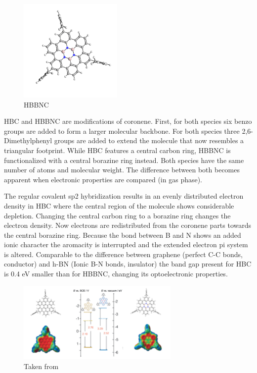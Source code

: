 \label{section_HBBNC}

\begin{figure}\centering
	\includegraphics[angle=90,width=5cm]{./images/molecules/max-zoom/HBBNC-600}
	\caption{HBBNC}
	\label{fig:HBBNC-molecule}
\end{figure}

HBC and HBBNC are modifications of coronene. First, for both species six benzo groups are added to form a larger molecular backbone. For both species three 2,6-Dimethylphenyl groups are added to extend the molecule that now resembles a triangular footprint. While HBC features a central carbon ring, HBBNC is functionalized with a central borazine ring instead.
Both species have the same number of atoms and molecular weight. The difference between both becomes apparent when electronic properties are compared (in gas phase).


The regular covalent sp2 hybridization results in an evenly distributed electron density in HBC where the central region of the molecule shows considerable depletion. Changing the central carbon ring to a borazine ring changes the electron density. Now electrons are redistributed from the coronene parts towards the central borazine ring. Because the bond between B and N shows an added ionic character the aromacity is interrupted and the extended electron pi system is altered. Comparable to the difference between graphene (perfect C-C bonds, conductor) and h-BN (Ionic B-N bonds, insulator) the band gap present for HBC is 0.4 eV smaller than for HBBNC, changing its optoelectronic properties.


\begin{figure}[]\centering
		\includegraphics[width=0.7\textwidth]{./images/Dosso-combined}
	\caption{Taken from \cite{dosso_synthesis_2017}}
	\label{}
\end{figure}

